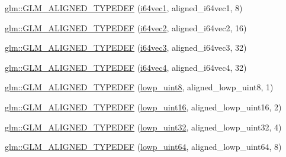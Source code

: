 \begin{DoxyCompactItemize}
\item 
\mbox{\hyperlink{group__gtx__type__aligned_ga965b1c9aa1800e93d4abc2eb2b5afcbf}{glm\+::\+G\+L\+M\+\_\+\+A\+L\+I\+G\+N\+E\+D\+\_\+\+T\+Y\+P\+E\+D\+EF}} (\mbox{\hyperlink{group__gtc__type__precision_ga7ee2c91a98ebd719ae26e15ad89106de}{i64vec1}}, aligned\+\_\+i64vec1, 8)
\item 
\mbox{\hyperlink{group__gtx__type__aligned_ga1f9e9c2ea2768675dff9bae5cde2d829}{glm\+::\+G\+L\+M\+\_\+\+A\+L\+I\+G\+N\+E\+D\+\_\+\+T\+Y\+P\+E\+D\+EF}} (\mbox{\hyperlink{group__gtc__type__precision_ga5a03cb457be28a9a8b9e61163fe648a1}{i64vec2}}, aligned\+\_\+i64vec2, 16)
\item 
\mbox{\hyperlink{group__gtx__type__aligned_gad77c317b7d942322cd5be4c8127b3187}{glm\+::\+G\+L\+M\+\_\+\+A\+L\+I\+G\+N\+E\+D\+\_\+\+T\+Y\+P\+E\+D\+EF}} (\mbox{\hyperlink{group__gtc__type__precision_ga189eb8d6a197bc491cabb6e1f120ecf4}{i64vec3}}, aligned\+\_\+i64vec3, 32)
\item 
\mbox{\hyperlink{group__gtx__type__aligned_ga716f8ea809bdb11b5b542d8b71aeb04f}{glm\+::\+G\+L\+M\+\_\+\+A\+L\+I\+G\+N\+E\+D\+\_\+\+T\+Y\+P\+E\+D\+EF}} (\mbox{\hyperlink{group__gtc__type__precision_gade5e969a6155752095d2cd603bda9408}{i64vec4}}, aligned\+\_\+i64vec4, 32)
\item 
\mbox{\hyperlink{group__gtx__type__aligned_gad46f8e9082d5878b1bc04f9c1471cdaa}{glm\+::\+G\+L\+M\+\_\+\+A\+L\+I\+G\+N\+E\+D\+\_\+\+T\+Y\+P\+E\+D\+EF}} (\mbox{\hyperlink{group__gtc__type__precision_ga4d9dc08b7b248a386dfe9afd00fc6b1e}{lowp\+\_\+uint8}}, aligned\+\_\+lowp\+\_\+uint8, 1)
\item 
\mbox{\hyperlink{group__gtx__type__aligned_ga1246094581af624aca6c7499aaabf801}{glm\+::\+G\+L\+M\+\_\+\+A\+L\+I\+G\+N\+E\+D\+\_\+\+T\+Y\+P\+E\+D\+EF}} (\mbox{\hyperlink{group__gtc__type__precision_ga9b8409887319f62f06e664f6ca121b9d}{lowp\+\_\+uint16}}, aligned\+\_\+lowp\+\_\+uint16, 2)
\item 
\mbox{\hyperlink{group__gtx__type__aligned_ga7a5009a1d0196bbf21dd7518f61f0249}{glm\+::\+G\+L\+M\+\_\+\+A\+L\+I\+G\+N\+E\+D\+\_\+\+T\+Y\+P\+E\+D\+EF}} (\mbox{\hyperlink{group__gtc__type__precision_gaf11e85af414720b4cd12bd57b3a81e68}{lowp\+\_\+uint32}}, aligned\+\_\+lowp\+\_\+uint32, 4)
\item 
\mbox{\hyperlink{group__gtx__type__aligned_ga45213fd18b3bb1df391671afefe4d1e7}{glm\+::\+G\+L\+M\+\_\+\+A\+L\+I\+G\+N\+E\+D\+\_\+\+T\+Y\+P\+E\+D\+EF}} (\mbox{\hyperlink{group__gtc__type__precision_gacf666a9d9b309c4615c7a4f2ab0be289}{lowp\+\_\+uint64}}, aligned\+\_\+lowp\+\_\+uint64, 8)
\item 

\end{DoxyCompactItemize}
